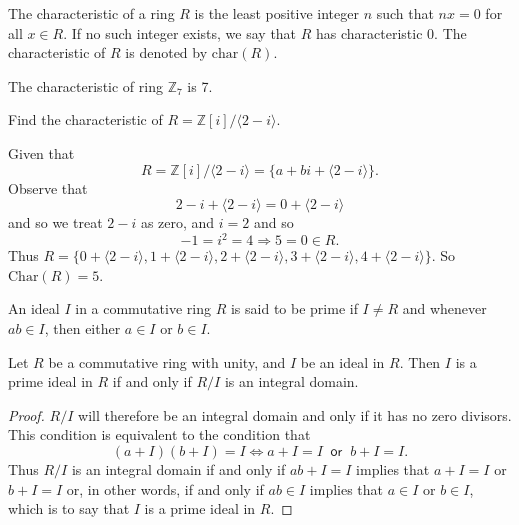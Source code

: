 \begin{definition}
    The characteristic of a ring $R$ is the least positive integer $n$ such that $nx = 0$ for all $x \in R$. If no such integer exists, we say that 
    $R$ has characteristic 0. The characteristic of $R$ is denoted by $\text{char}(R)$.
\end{definition}

\begin{example}
    The characteristic of ring $\mathbb{Z}_7$ is 7.
\end{example}

\begin{example}
    Find the characteristic of $R = \mathbb{Z}[i] / \langle 2 - i \rangle$.
\end{example}
\begin{solution}
    Given that 
    \[
        R = \mathbb{Z}[i] / \langle 2 - i \rangle = \{ a + bi + \langle 2-i \rangle \}.
    \]
    Observe that 
    \[
        2 - i + \langle 2-i \rangle = 0 + \langle 2-i \rangle 
    \]
    and so we treat $2 - i$ as zero, and $i = 2$ and so 
    \[
        -1 = i^2 = 4 \Longrightarrow 5 = 0 \in R.
    \]
    Thus $R = \{ 0+\langle 2-i \rangle, 1 + \langle 2-i \rangle, 2 + \langle 2-i \rangle, 
    3 + \langle 2-i \rangle, 4 + \langle 2-i \rangle\}$. So $\text{Char}(R) = 5$.
\end{solution}

\begin{definition}
    An ideal $I$ in a commutative ring $R$ is said to be prime if $I \neq R$ and whenever 
    $ab \in I$, then either $a \in I$ or $b \in I$.
\end{definition}

\begin{lemma}
    Let $R$ be a commutative ring with unity, and $I$ be an ideal in $R$. Then $I$ is 
    a prime ideal in $R$ if and only if $R/I$ is an integral domain.
\end{lemma}
\begin{proof}
    $R/I$ will therefore be an integral domain and only if it has no zero divisors. This condition 
    is equivalent to the condition that 
    \[
        (a+I)(b+I) = I \iff a + I = I \> \textsf{ or } \> b + I = I.
    \]
    Thus $R/I$ is an integral domain if and only if $ab + I = I$ implies that 
    $a + I = I$ or $b+I = I$ or, in other words, if and only if 
    $ab \in I$ implies that $a \in I$ or $b \in I$, which is to say that $I$ is a prime ideal 
    in $R$. 
\end{proof}

